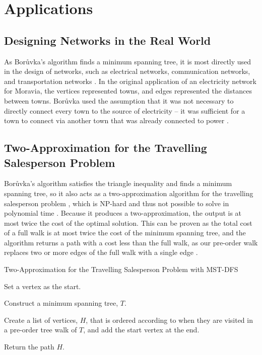 \documentclass[a4paper, 11pt]{article}
\begin{document}
\section{Applications}

\subsection{Designing Networks in the Real World}
As Borůvka's algorithm finds a minimum spanning tree, it is most directly used in the design of networks, such as electrical networks, communication networks, and transportation networks \cite{graham1985history}. In the original application of an electricity network for Moravia, the vertices represented towns, and edges represented the distances between towns. Borůvka used the assumption that it was not necessary to directly connect every town to the source of electricity -- it was sufficient for a town to connect via another town that was already connected to power \cite{nevsetvril2001otakar}.

\subsection{Two-Approximation for the Travelling Salesperson Problem}
Borůvka's algorithm satisfies the triangle inequality and finds a minimum spanning tree, so it also acts as a two-approximation algorithm for the travelling salesperson problem \cite{andreae1995performance}, which is NP-hard and thus not possible to solve in polynomial time \cite{junger1995traveling}. Because it produces a two-approximation, the output is at most twice the cost of the optimal solution. This can be proven as the total cost of a full walk is at most twice the cost of the minimum spanning tree, and the algorithm returns a path with a cost less than the full walk, as our pre-order walk replaces two or more edges of the full walk with a single edge \cite{andreae1995performance}.

\begin{algorithm}
    \caption{Two-Approximation for the Travelling Salesperson Problem with MST-DFS \cite{andreae1995performance}}
    \nl Set a vertex as the start.
    
    \nl Construct a minimum spanning tree, $T$.
    
    \nl Create a list of vertices, $H$, that is ordered according to when they are visited in a pre-order tree walk of $T$, and add the start vertex at the end.
    
    \nl Return the path $H$.
\end{algorithm}
\end{document}
